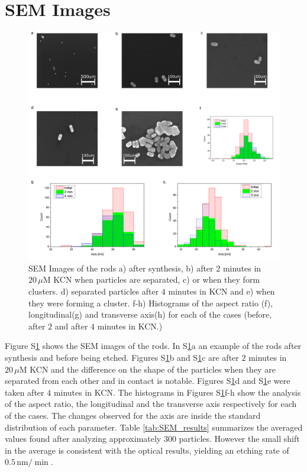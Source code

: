 \documentclass[a4paper,oneside,onecolumn]{article}
\newcommand{\uM}{\ensuremath{\,\mu\textrm{M}}}
\begin{document}
\section{SEM Images}

\begin{figure}[tp]
 \centering
 \includegraphics[width=0.95\linewidth]{Figures/04_Supporting/02_SEM/sem.png}
 \caption{SEM Images of the rods a) after synthesis, b) after $2$ minutes in
 $20\uM$ KCN when particles are separated, c) or when they form clusters. d)
 separated particles after $4$ minutes in KCN and e) when they were forming a
 cluster. f-h) Histograms of the aspect ratio (f), longitudinal(g) and
 transverse axis(h) for each of the cases (before, after $2$ and after $4$
 minutes in KCN.) }
 \label{fig:SEM}
\end{figure}

Figure S\ref{fig:SEM} shows the SEM images of the rods. In S\ref{fig:SEM}a an
example of the rods after synthesis and before being etched.
Figures S\ref{fig:SEM}b and S\ref{fig:SEM}c are after $2$ minutes in $20\uM$ KCN
and the difference on the shape of the particles when they are separated from each other and in contact is
notable. Figures S\ref{fig:SEM}d and S\ref{fig:SEM}e were taken after $4$
minutes in KCN.
The histograms in Figures S\ref{fig:SEM}f-h show the analysis of the aspect
ratio, the longitudinal and the transverse axis respectively for each of the  cases. The
changes observed for the axis are inside the standard distribution of each
parameter. Table \ref{tab:SEM_results} summarizes the averaged values found
after analyzing approximately $300$ particles. However the small shift in the
average is consistent with the optical results, yielding an etching rate of
$0.5\,\textrm{nm}/\min$.
\end{document}

